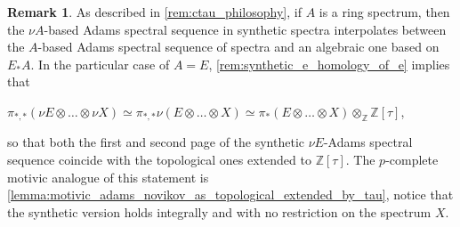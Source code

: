 \documentclass[oneside,a4paper]{amsart}
\theoremstyle{plain}
\theoremstyle{definition}
\newtheorem{rem}[thm]{Remark}
\theoremstyle{remark}
\begin{document}
\begin{rem}
As described in \cref{rem:ctau_philosophy}, if $A$ is a ring spectrum, then the $\nu A$-based Adams spectral sequence in synthetic spectra interpolates between the $A$-based Adams spectral sequence of spectra and an algebraic one based on $E_{*}A$. In the particular case of $A = E$, \cref{rem:synthetic_e_homology_of_e} implies that 

\begin{center}
$\pi_{*, *} (\nu E \otimes \ldots \otimes \nu X) \simeq \pi_{*, *} \nu (E \otimes \ldots \otimes X) \simeq \pi_{*} (E \otimes \ldots \otimes X) \otimes _{\mathbb{Z}} \mathbb{Z}[\tau]$,
\end{center}
so that both the first and second page of the synthetic $\nu E$-Adams spectral sequence coincide with the topological ones extended to $\mathbb{Z}[\tau]$. The $p$-complete motivic analogue of this statement is \cref{lemma:motivic_adams_novikov_as_topological_extended_by_tau}, notice that the synthetic version holds integrally and with no restriction on the spectrum $X$. 
\end{rem}
\end{document}
